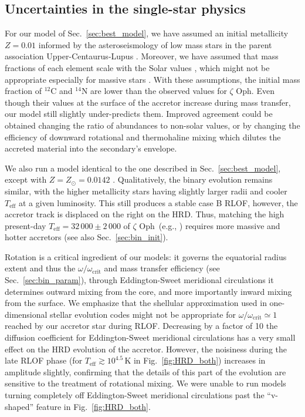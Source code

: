 \documentclass[twocolumn,twocolappendix,trackchanges]{aastex63}
\DeclareRobustCommand{\Figref}[1]{Fig.~\ref{#1}}
\DeclareRobustCommand{\Secref}[1]{Sec.~\ref{#1}}
\newcommand{\zoph}{$\zeta$ Oph}
\begin{document}
\subsection{Uncertainties in the single-star physics}
\label{sec:single_star_uncertainties}

For our model of \Secref{sec:best_model}, we have assumed an initial
metallicity $Z=0.01$ informed by the asteroseismology of low mass
stars in the parent association Upper-Centaurus-Lupus \citep[e.g.,][]{murphy:21}. Moreover,
we have assumed that mass fractions of each element scale with the Solar values
\citep{grevesse:98}, which might not be appropriate especially for
massive stars \citep[e.g.,][]{grasha:21}. With these assumptions, the
initial mass fraction of $^{12}\mathrm{C}$ and $^{14}\mathrm{N}$ are
lower than the observed values for \zoph. Even though their values at
the surface of the accretor increase during mass transfer, our model
still slightly under-predicts them. Improved agreement could be
obtained changing the ratio of abundances to non-solar values, or by
changing the efficiency of downward rotational and thermohaline mixing
which dilutes the accreted material into the secondary's envelope.

We also run a model identical to the one described in
\Secref{sec:best_model}, except with $Z=Z_\odot=0.0142$
\citep{asplund:09}. Qualitatively, the binary evolution remains
similar, with the higher metallicity stars having slightly larger
radii and cooler $T_\mathrm{eff}$ at a given luminosity. This still
produces a stable case B RLOF, however, the accretor track is
displaced on the right on the HRD. Thus, matching the high present-day
$T_\mathrm{eff}=32\,000\pm2\,000$ of \zoph\ (e.g., ) requires more
massive and hotter accretors (see also \Secref{sec:bin_init}).

Rotation is a critical ingredient of our models: it governs the
equatorial radius extent and thus the $\omega/\omega_\mathrm{crit}$
and mass transfer efficiency (see \Secref{sec:bin_param}), through
Eddington-Sweet meridional circulations it determines outward mixing
from the core, and more importantly inward mixing from the surface.
We emphasize that the shellular approximation used in one-dimensional
stellar evolution codes might not be appropriate for
$\omega/\omega_\mathrm{crit}\simeq 1$ reached by our accretor star
during RLOF. Decreasing by a factor of 10 the diffusion coefficient
for Eddington-Sweet meridional circulations has a very small effect on
the HRD evolution of the accretor. However, the noisiness during the
late RLOF phase (for $T_\mathrm{eff}\gtrsim10^{4.5}$\,K in
\Figref{fig:HRD_both}) increases in amplitude slightly, confirming
that the details of this part of the evolution are sensitive to the
treatment of rotational mixing. We were unable to run models turning
completely off Eddington-Sweet meridional circulations past the
``v-shaped'' feature in \Figref{fig:HRD_both}.
\end{document}
